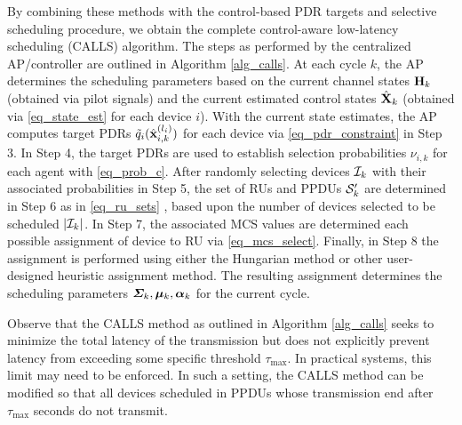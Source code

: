 By combining these methods with the control-based PDR targets and selective scheduling procedure, we obtain the complete control-aware low-latency scheduling (CALLS) algorithm. The steps as performed by the centralized AP/controller are outlined in Algorithm \ref{alg_calls}. At each cycle $k$, the AP determines the scheduling parameters based on the current channel states ${\mathbf H}_k$ (obtained via pilot signals) and the current estimated control states ${\hat{\mathbf X} }_k$ (obtained via \eqref{eq_state_est} for each device $i$). With the current state estimates, the AP computes target PDRs  ${\tilde q}_i({\hat{\mathbf x} }^{(l_i)}_{i,k})$ for each device via \eqref{eq_pdr_constraint} in Step 3. In Step 4, the target PDRs are used to establish selection probabilities $\nu_{i,k}$ for each agent with \eqref{eq_prob_c}. After randomly selecting devices ${\mathcal I}_k$ with their associated probabilities in Step 5, the set of RUs and PPDUs ${\mathcal S}'_k$ are determined in Step 6 as in \eqref{eq_ru_sets} , based upon the number of devices selected to be scheduled $|{\mathcal I}_k|$. In Step 7, the associated MCS values are determined each possible assignment of device to RU via \eqref{eq_mcs_select}. Finally, in Step 8 the assignment is performed using either the Hungarian method \cite{kuhn1955hungarian} or other user-designed heuristic assignment method. The resulting assignment determines the scheduling parameters $\boldsymbol{\Sigma}_k, \boldsymbol{\mu}_k, \boldsymbol{\alpha}_k$ for the current cycle. 
 
 \begin{remark}\label{remark_latency}\normalfont
 Observe that the CALLS method as outlined in Algorithm \ref{alg_calls} seeks to minimize the total latency of the transmission but does not explicitly prevent latency from exceeding some specific threshold $\tau_{\max}$. In practical systems, this limit may need to be enforced. In such a setting, the CALLS method can be modified so that all devices scheduled in PPDUs whose transmission end after $\tau_{\max}$ seconds do not transmit. 
 \end{remark}

